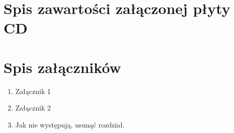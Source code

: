 \documentclass[a4paper,11pt,twoside]{report}
\theoremstyle{definition}
\begin{document}


\chapter*{Spis zawartości załączonej płyty CD}



\chapter*{Spis załączników}
\begin{enumerate}
\item Załącznik 1
\item Załącznik 2
\item Jak nie występują, usunąć rozdział.
\end{enumerate}
\end{document}
